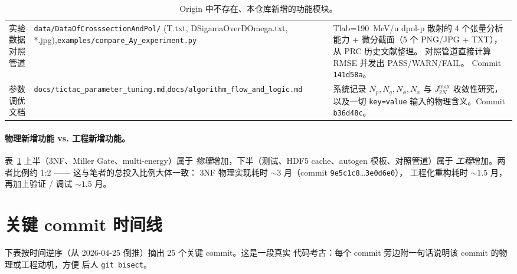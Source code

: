 \begin{table}[t]
\begin{tabular}{@{}p{30mm}p{55mm}p{60mm}@{}}
实验数据对照管道
& \texttt{data/DataOfCrosssectionAndPol/} (T.txt, DSigamaOverDOmega.txt, *.jpg),\newline\texttt{examples/compare\_Ay\_experiment.py}
& Tlab=190~MeV/u dpol-p 散射的 4 个张量分析能力 + 微分截面（5 个 PNG/JPG +
  TXT），从 PRC 历史文献整理。
  对照管道直接计算 RMSE 并发出 PASS/WARN/FAIL。
  Commit \texttt{141d58a}。 \\

参数调优文档
& \texttt{docs/tictac\_parameter\_tuning.md},\newline\texttt{docs/algorithm\_flow\_and\_logic.md}
& 系统记录 $N_p, N_q, N_\phi, N_x$ 与 $J_{2N}^{\max}$ 收敛性研究，
  以及一切 \texttt{key=value} 输入的物理含义。Commit \texttt{b36d48c}。 \\

\bottomrule
\end{tabular}
\caption{Origin 中不存在、本仓库新增的功能模块。}
\label{tab:ch19:features}
\end{table}

\paragraph{物理新增功能 vs. 工程新增功能。}
%
表~\ref{tab:ch19:features} 上半（3NF、Miller Gate、multi-energy）属于
\emph{物理}增加，下半（测试、HDF5 cache、autogen 模板、对照管道）属于
\emph{工程}增加。两者比例约 1:2 —— 这与笔者的总投入比例大体一致：
3NF 物理实现耗时 ${\sim}3$ 月（commit \texttt{9e5c1c8}\ldots\texttt{3e0d6e0}），
工程化重构耗时 ${\sim}1.5$ 月，再加上验证 / 调试 ${\sim}1.5$ 月。

\section{关键 commit 时间线}
\label{sec:19:timeline}

下表按时间逆序（从 2026-04-25 倒推）摘出 25 个关键 commit。这是一段真实
代码考古：每个 commit 旁边附一句话说明该 commit 的物理或工程动机，方便
后人 \texttt{git bisect}。


